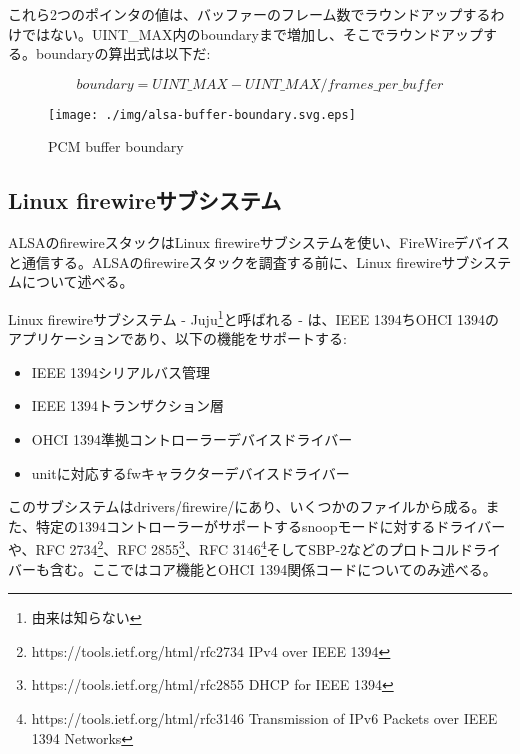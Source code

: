 \documentclass[onecolumn]{jarticle}
\begin{document}
これら2つのポインタの値は、バッファーのフレーム数でラウンドアップするわけではない。UINT\_MAX内のboundaryまで増加し、そこでラウンドアップする。boundaryの算出式は以下だ:

\begin{equation}
boundary = UINT\_MAX - UINT\_MAX / frames\_per\_buffer 
\end{equation}

\begin{figure}[H]
	\centering
	\texttt{[image: ./img/alsa-buffer-boundary.svg.eps]}
	\caption{{PCM buffer boundary}}
	\label{alsa--buffer-boundary}
\end{figure}


\subsection{Linux firewireサブシステム}

ALSAのfirewireスタックはLinux firewireサブシステムを使い、FireWireデバイスと通信する。ALSAのfirewireスタックを調査する前に、Linux firewireサブシステムについて述べる。

Linux firewireサブシステム - Juju\footnote{由来は知らない}と呼ばれる - は、IEEE 1394ちOHCI 1394のアプリケーションであり、以下の機能をサポートする:

\begin{itemize}
\small
\item IEEE 1394シリアルバス管理
\item IEEE 1394トランザクション層
\item OHCI 1394準拠コントローラーデバイスドライバー
\item unitに対応するfwキャラクターデバイスドライバー
\end{itemize}

このサブシステムはdrivers/firewire/にあり、いくつかのファイルから成る。また、特定の1394コントローラーがサポートするsnoopモードに対するドライバーや、RFC 2734\footnote{https://tools.ietf.org/html/rfc2734 IPv4 over IEEE 1394}、RFC 2855\footnote{https://tools.ietf.org/html/rfc2855 DHCP for IEEE 1394}、RFC 3146\footnote{https://tools.ietf.org/html/rfc3146 Transmission of IPv6 Packets over IEEE 1394 Networks}そしてSBP-2などのプロトコルドライバーも含む。ここではコア機能とOHCI 1394関係コードについてのみ述べる。
\end{document}
